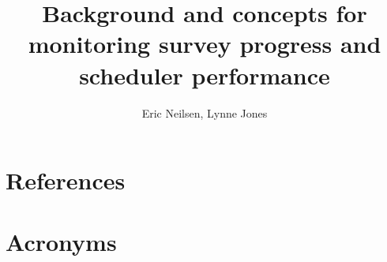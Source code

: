 \documentclass[DM,authoryear,toc]{lsstdoc}
\title{Background and concepts for monitoring survey progress and scheduler performance}
\author{%
Eric Neilsen,
Lynne Jones
}
\date{\vcsDate}
\begin{document}
\maketitle




\appendix
\section{References} \label{sec:bib}
\renewcommand{\refname}{} %


\section{Acronyms} \label{sec:acronyms}

\end{document}
